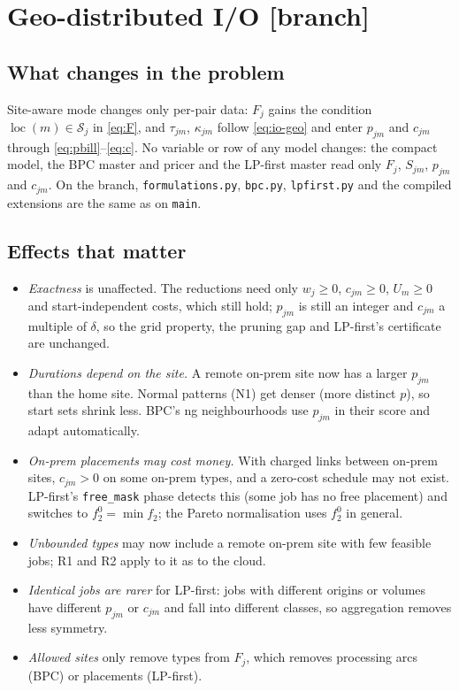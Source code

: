 \documentclass[11pt,a4paper]{article}
\theoremstyle{definition}
\theoremstyle{remark}
\newcommand{\Sites}{\mathcal{S}}
\newcommand{\code}[1]{\texttt{#1}}
\newcommand{\loc}{\operatorname{loc}}
\newcommand{\status}[1]{\textsf{\small[#1]}}
\begin{document}
\section{Geo-distributed I/O \status{branch}}\label{sec:geo}

\subsection{What changes in the problem}
Site-aware mode changes only per-pair data: $F_j$ gains the condition
$\loc(m)\in\Sites_j$ in \eqref{eq:F}, and $\tau_{jm}$, $\kappa_{jm}$ follow
\eqref{eq:io-geo} and enter $p_{jm}$ and $c_{jm}$ through
\eqref{eq:pbill}--\eqref{eq:c}. No variable or row of any model changes: the
compact model, the BPC master and pricer and the LP-first master read only
$F_j$, $S_{jm}$, $p_{jm}$ and $c_{jm}$. On the branch, \code{formulations.py},
\code{bpc.py}, \code{lpfirst.py} and the compiled extensions are the same as on
\code{main}.

\subsection{Effects that matter}
\begin{itemize}[leftmargin=*]
\item \emph{Exactness} is unaffected. The reductions need only $w_j\ge0$,
  $c_{jm}\ge0$, $U_m\ge0$ and start-independent costs, which still hold;
  $p_{jm}$ is still an integer and $c_{jm}$ a multiple of $\delta$, so the grid
  property, the pruning gap and LP-first's certificate are unchanged.
\item \emph{Durations depend on the site.} A remote on-prem site now has a
  larger $p_{jm}$ than the home site. Normal patterns (N1) get denser (more
  distinct $p$), so start sets shrink less. BPC's ng neighbourhoods use
  $p_{jm}$ in their score and adapt automatically.
\item \emph{On-prem placements may cost money.} With charged links between
  on-prem sites, $c_{jm}>0$ on some on-prem types, and a zero-cost schedule
  may not exist. LP-first's \code{free\_mask} phase detects this (some job has
  no free placement) and switches to $f_2^0=\min f_2$; the Pareto normalisation
  uses $f_2^0$ in general.
\item \emph{Unbounded types} may now include a remote on-prem site with few
  feasible jobs; R1 and R2 apply to it as to the cloud.
\item \emph{Identical jobs are rarer} for LP-first: jobs with different origins
  or volumes have different $p_{jm}$ or $c_{jm}$ and fall into different
  classes, so aggregation removes less symmetry.
\item \emph{Allowed sites} only remove types from $F_j$, which removes
  processing arcs (BPC) or placements (LP-first).
\end{itemize}
\end{document}
